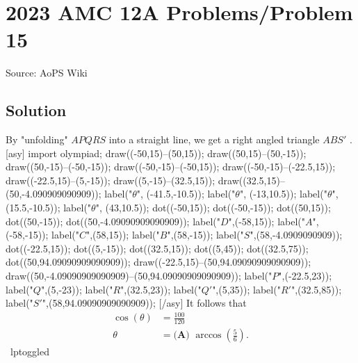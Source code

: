 \documentclass[12pt]{article}
\begin{document}
\section*{{2023 AMC 12A Problems/Problem 15}}
Source: AoPS Wiki

\subsection*{Solution}
By "unfolding" $APQRS$ into a straight line, we get a right angled triangle $ABS'$ . [asy] import olympiad; draw((-50,15)--(50,15)); draw((50,15)--(50,-15)); draw((50,-15)--(-50,-15)); draw((-50,-15)--(-50,15)); draw((-50,-15)--(-22.5,15)); draw((-22.5,15)--(5,-15)); draw((5,-15)--(32.5,15)); draw((32.5,15)--(50,-4.090909090909)); label("$\theta$", (-41.5,-10.5)); label("$\theta$", (-13,10.5)); label("$\theta$", (15.5,-10.5)); label("$\theta$", (43,10.5)); dot((-50,15)); dot((-50,-15)); dot((50,15)); dot((50,-15)); dot((50,-4.09090909090909)); label("$D$",(-58,15)); label("$A$",(-58,-15)); label("$C$",(58,15)); label("$B$",(58,-15)); label("$S$",(58,-4.0909090909)); dot((-22.5,15)); dot((5,-15)); dot((32.5,15)); dot((5,45)); dot((32.5,75)); dot((50,94.09090909090909)); draw((-22.5,15)--(50,94.09090909090909)); draw((50,-4.09090909090909)--(50,94.09090909090909)); label("$P$",(-22.5,23)); label("$Q$",(5,-23)); label("$R$",(32.5,23)); label("$Q'$",(5,35)); label("$R'$",(32.5,85)); label("$S'$",(58,94.09090909090909)); [/asy] It follows that \begin{align*} \cos(\theta)&=\frac{100}{120} \\ \theta&=\boxed{\textbf{(A) } \arccos\left(\frac{5}{6}\right)}. \end{align*} ~lptoggled
\end{document}
